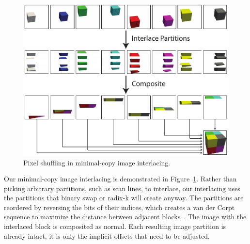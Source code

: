 \documentclass{sig-alternate}
\newcommand*{\lcite}[1]{~\cite{#1}}
\begin{document}
\begin{figure}[htbp]
  \centering
  \includegraphics{images/InterlaceDiagram}
  \caption{Pixel shuffling in minimal-copy image interlacing.}
  \label{fig:Interlacing}
\end{figure}

Our minimal-copy image interlacing is demonstrated in
Figure~\ref{fig:Interlacing}.  Rather than picking arbitrary partitions,
such as scan lines, to interlace, our interlacing uses the partitions that
binary swap or radix-k will create anyway.  The partitions are reordered by
reversing the bits of their indices, which creates a van der Corpt sequence
to maximize the distance between adjacent blocks\lcite{LaValle2006}.  The
image with the interlaced block is composited as normal.  Each resulting
image partition is already intact, it is only the implicit offsets that
need to be adjusted.
\end{document}
